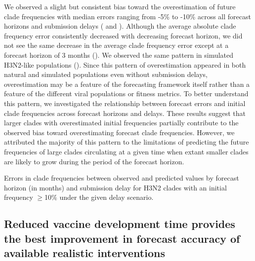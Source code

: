 \documentclass[9pt,lineno]{elife}
\begin{document}
We observed a slight but consistent bias toward the overestimation of future clade frequencies with median errors ranging from -5\% to -10\% across all forecast horizons and submission delays ( and ).
Although the average absolute clade frequency error consistently decreased with decreasing forecast horizon, we did not see the same decrease in the average clade frequency error except at a forecast horizon of 3 months ().
We observed the same pattern in simulated H3N2-like populations ().
Since this pattern of overestimation appeared in both natural and simulated populations even without submission delays, overestimation may be a feature of the forecasting framework itself rather than a feature of the different viral populations or fitness metrics.
To better understand this pattern, we investigated the relationship between forecast errors and initial clade frequencies across forecast horizons and delays.
These results suggest that larger clades with overestimated initial frequencies partially contribute to the observed bias toward overestimating forecast clade frequencies.
However, we attributed the majority of this pattern to the limitations of predicting the future frequencies of large clades circulating at a given time when extant smaller clades are likely to grow during the period of the forecast horizon.

\begin{table}[htb]
  \begin{center}
    
    \caption{Errors in clade frequencies between observed and predicted values by forecast horizon (in months) and submission delay for H3N2 clades with an initial frequency $\geq$10\% under the given delay scenario.}
    \label{tab:h3n2_forecast_clade_frequency_errors}
  \end{center}
\end{table}

\subsection{Reduced vaccine development time provides the best improvement in forecast accuracy of available realistic interventions}
\end{document}
